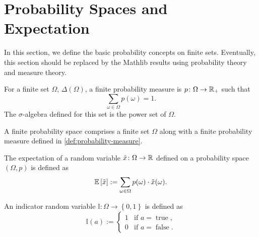 %


\section{Probability Spaces and Expectation}

In this section, we define the basic probability concepts on finite sets. Eventually, this section should be replaced by the Mathlib results using probability theory and measure theory.

\begin{definition} \label{def:probability-measure}
  For a finite set $\Omega$, $\Delta(\Omega)$, a finite probability measure is  $p\colon \Omega \to \mathbb{R}_+$ such that
  \[
   \sum_{\omega \in \Omega } p(\omega) = 1. 
 \]
 The $\sigma$-algebra defined for this set is the power set of $\Omega$.
  \leanok
\end{definition}

\begin{definition} \label{def:probability-space}
  A finite probability space comprises a finite set $\Omega$ along with a finite probability measure defined in \cref{def:probability-measure}.
  \leanok
\end{definition}

\begin{definition}[Expectation]
  The expectation of a random variable $\tilde{x} \colon \Omega \to \mathbb{R}$ defined on a probability space $(\Omega, p)$ is defined as
  \[
    \mathbb{E} \left[ \tilde{x} \right] := \sum_{\omega \in \Omega } p(\omega ) \cdot \tilde{x}(\omega).
  \]
  \leanok
\end{definition}

\begin{definition}[Indicator]
  An indicator random variable $\mathbb{I}\colon  \Omega \to \left\{ 0, 1 \right\}$ is defined as
  \[
    \mathbb{I}(a) :=
    \begin{cases}
      1 &\text{if } a = \operatorname{true}, \\
      0 &\text{if } a = \operatorname{false}.
    \end{cases}
  \]
  \leanok
\end{definition}

